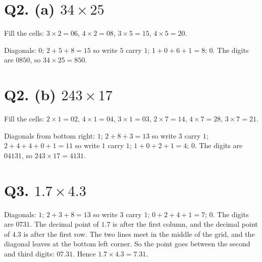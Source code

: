 \documentclass[12pt,a4paper]{article}
\newcommand{\lsetup}[2]{%
  \edef\lC{\the\numexpr#1\relax}\edef\lR{\the\numexpr#2\relax}%
  \edef\lCm{\the\numexpr#1-1\relax}\edef\lRm{\the\numexpr#2-1\relax}}
\newcommand{\lgrid}{%
  \draw[thick] (0,0) rectangle (\lC,\lR);
  \foreach \i in {1,...,\lCm}{\draw (\i,0) -- (\i,\lR);}
  \foreach \j in {1,...,\lRm}{\draw (0,\j) -- (\lC,\j);}
  \foreach \i in {1,...,\lC}{\foreach \j in {1,...,\lR}{%
    \draw[gray!75] ({\i-1},{\j-1}) -- (\i,\j);}}}
\newcommand{\ltop}[2]{\node[font=\small] at ({#1-0.5},{\lR+0.34}) {#2};}
\newcommand{\lside}[2]{\node[font=\small] at ({\lC+0.34},{\lR-#1+0.5}) {#2};}
\newcommand{\lcell}[4]{%
  \node[font=\small] at ({#1-0.72},{\lR-#2+0.70}) {#3};
  \node[font=\small] at ({#1-0.28},{\lR-#2+0.30}) {#4};}
\newcommand{\lleft}[2]{\node[font=\small] at (-0.44,{\lR-#1+0.5}) {#2};}
\newcommand{\lbot}[2]{\node[font=\small] at ({#1-0.5},-0.42) {#2};}
\newcommand{\ltopdot}[1]{\fill (#1,{\lR+0.2}) circle (1.8pt);}
\newcommand{\lsidedot}[1]{\fill ({\lC+0.34},{\lR-#1}) circle (1.8pt);}
\newcommand{\lmeet}[2]{%
  \pgfmathsetmacro{\lmx}{#1}%
  \pgfmathsetmacro{\lmy}{\lR-#2}%
  \pgfmathsetmacro{\lts}{min(\lmx,\lmy)}%
  \pgfmathsetmacro{\lex}{\lmx-\lts}%
  \pgfmathsetmacro{\ley}{\lmy-\lts}%
  \pgfmathsetmacro{\ldx}{\lex<0.5 ? -0.44 : \lex}%
  \pgfmathsetmacro{\ldy}{\ley<0.5 ? -0.42 : \ley}}
\newcommand{\ltrace}[2]{\lmeet{#1}{#2}%
  \draw[red!75!black,dashed,-{Stealth[length=2mm]}] ({\lmx},{\lR+0.1}) -- ({\lmx},{\lmy});
  \draw[red!75!black,dashed,-{Stealth[length=2mm]}] ({\lC+0.12},{\lmy}) -- ({\lmx},{\lmy});
  \ifdim\lts pt>0.1pt
    \draw[red!75!black,dashed,thick,-{Stealth[length=2mm]}] ({\lmx},{\lmy}) -- ({\lex},{\ley});
  \fi
  \fill[red!75!black] ({\ldx},{\ldy}) circle (2.1pt);}
\begin{document}
\section*{Q2. (a) $34\times25$}
Fill the cells: $3\times2=06$, $4\times2=08$, $3\times5=15$, $4\times5=20$.
\begin{center}
\end{center}
Diagonals: $0$; $2+5+8=15$ so write $5$ carry $1$; $1+0+6+1=8$; $0$. The digits are $0850$, so $34\times25=850$.

\section*{Q2. (b) $243\times17$}
Fill the cells: $2\times1=02$, $4\times1=04$, $3\times1=03$, $2\times7=14$, $4\times7=28$, $3\times7=21$.
\begin{center}
\end{center}
Diagonals from bottom right: $1$; $2+8+3=13$ so write $3$ carry $1$; $2+4+4+0+1=11$ so write $1$ carry $1$; $1+0+2+1=4$; $0$. The digits are $04131$, so $243\times17=4131$.

\section*{Q3. $1.7\times4.3$}
\begin{center}
\end{center}
Diagonals: $1$; $2+3+8=13$ so write $3$ carry $1$; $0+2+4+1=7$; $0$. The digits are $0731$. The decimal point of $1.7$ is after the first column, and the decimal point of $4.3$ is after the first row. The two lines meet in the middle of the grid, and the diagonal leaves at the bottom left corner. So the point goes between the second and third digits: $07.31$. Hence $1.7\times4.3=7.31$.
\end{document}
